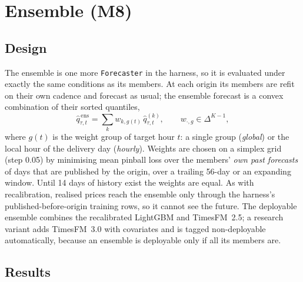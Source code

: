 \documentclass[11pt,a4paper]{article}
\newcommand{\code}[1]{\texttt{#1}}
\begin{document}
\section{Ensemble (M8)}

\subsection{Design}
The ensemble is one more \code{Forecaster} in the harness, so it is evaluated under exactly the
same conditions as its members. At each origin its members are refit on their own cadence and
forecast as usual; the ensemble forecast is a convex combination of their sorted quantiles,
\begin{equation}
\hat q^{\,\mathrm{ens}}_{\tau,t} = \sum_{k} w_{k,g(t)}\,\hat q^{(k)}_{\tau,t}, \qquad
w_{\cdot,g} \in \Delta^{K-1},
\end{equation}
where $g(t)$ is the weight group of target hour $t$: a single group (\emph{global}) or the local
hour of the delivery day (\emph{hourly}). Weights are chosen on a simplex grid (step 0.05) by
minimising mean pinball loss over the members' \emph{own past forecasts} of days that are
published by the origin, over a trailing 56-day or an expanding window. Until 14 days of
history exist the weights are equal. As with recalibration, realised prices reach the ensemble
only through the harness's published-before-origin training rows, so it cannot see the future.
The deployable ensemble combines the recalibrated LightGBM and TimesFM~2.5; a research variant
adds TimesFM~3.0 with covariates and is tagged non-deployable automatically, because an ensemble
is deployable only if all its members are.

\subsection{Results}
\end{document}
